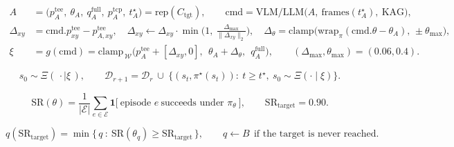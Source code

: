 \begin{align}
A&=\big(p^{\mathrm{tee}}_A,\ \theta_A,\ q^{\mathrm{full}}_A,\ p^{\mathrm{tcp}}_A,\ t^\star_A\big)=\mathrm{rep}(C_{\mathrm{tgt}}),
\qquad
\mathrm{cmd}=\mathrm{VLM/LLM}\big(A,\ \text{frames}(t^\star_A),\ \mathrm{KAG}\big),\nonumber\\
\Delta_{xy}&=\mathrm{cmd}.p^{\mathrm{tee}}_{xy}-p^{\mathrm{tee}}_{A,xy},\quad
\Delta_{xy}\leftarrow\Delta_{xy}\cdot\min\!\Big(1,\ \tfrac{\Delta_{\max}}{\|\Delta_{xy}\|_2}\Big),\quad
\Delta_\theta=\mathrm{clamp}\big(\mathrm{wrap}_\pi(\mathrm{cmd}.\theta-\theta_A),\,\pm\theta_{\max}\big),\nonumber\\
\xi&=g(\mathrm{cmd})=\mathrm{clamp}_{\,\mathcal{W}}\Big(p^{\mathrm{tee}}_A+[\Delta_{xy},0],\ \ \theta_A+\Delta_\theta,\ \ q^{\mathrm{full}}_A\Big),
\qquad
(\Delta_{\max},\theta_{\max})=(0.06,0.4).
\label{eq:prescribe}
\end{align}

\begin{equation}
s_0\sim\Xi(\,\cdot\mid\xi\,),
\qquad
\mathcal{D}_{r+1}=\mathcal{D}_r\ \cup\ \big\{(s_t,\pi^\star(s_t)):\ t\ge t^\star,\ s_0\sim\Xi(\cdot\mid\xi)\big\}.
\label{eq:prescribe-demo}
\end{equation}



\begin{equation}
\mathrm{SR}(\theta)=\frac{1}{|\mathcal{E}|}\sum_{e\in\mathcal{E}}\mathbf{1}\big[\ \text{episode }e\ \text{succeeds under }\pi_\theta\ \big],
\qquad \mathrm{SR}_{\mathrm{target}}=0.90.
\label{eq:sr}
\end{equation}

\begin{equation}
q(\mathrm{SR}_{\mathrm{target}})=\min\big\{\,q\ :\ \mathrm{SR}(\theta_q)\ge\mathrm{SR}_{\mathrm{target}}\,\big\},
\qquad
q\leftarrow B\ \ \text{if the target is never reached.}
\label{eq:queries}
\end{equation}

